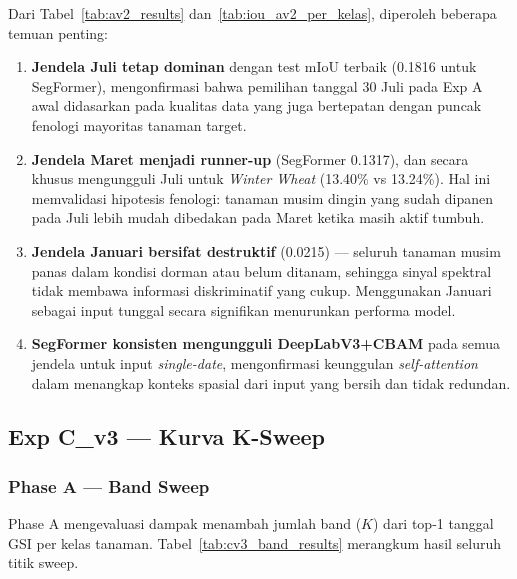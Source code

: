 Dari Tabel~\ref{tab:av2_results} dan~\ref{tab:iou_av2_per_kelas}, diperoleh beberapa temuan penting:

\begin{enumerate}
    \item \textbf{Jendela Juli tetap dominan} dengan test mIoU terbaik (0.1816 untuk SegFormer),
    mengonfirmasi bahwa pemilihan tanggal 30 Juli pada Exp A awal didasarkan pada kualitas data
    yang juga bertepatan dengan puncak fenologi mayoritas tanaman target.

    \item \textbf{Jendela Maret menjadi runner-up} (SegFormer 0.1317), dan secara khusus
    mengungguli Juli untuk \textit{Winter Wheat} (13.40\% vs 13.24\%). Hal ini memvalidasi
    hipotesis fenologi: tanaman musim dingin yang sudah dipanen pada Juli lebih mudah dibedakan
    pada Maret ketika masih aktif tumbuh.

    \item \textbf{Jendela Januari bersifat destruktif} (0.0215) --- seluruh tanaman musim panas
    dalam kondisi dorman atau belum ditanam, sehingga sinyal spektral tidak membawa informasi
    diskriminatif yang cukup. Menggunakan Januari sebagai input tunggal secara signifikan
    menurunkan performa model.

    \item \textbf{SegFormer konsisten mengungguli DeepLabV3+CBAM} pada semua jendela untuk
    input \textit{single-date}, mengonfirmasi keunggulan \textit{self-attention} dalam
    menangkap konteks spasial dari input yang bersih dan tidak redundan.
\end{enumerate}

\subsection{Exp C\_v3 — Kurva K-Sweep}

\subsubsection{Phase A — Band Sweep}

Phase A mengevaluasi dampak menambah jumlah band ($K$) dari top-1 tanggal GSI per kelas tanaman.
Tabel~\ref{tab:cv3_band_results} merangkum hasil seluruh titik sweep.

